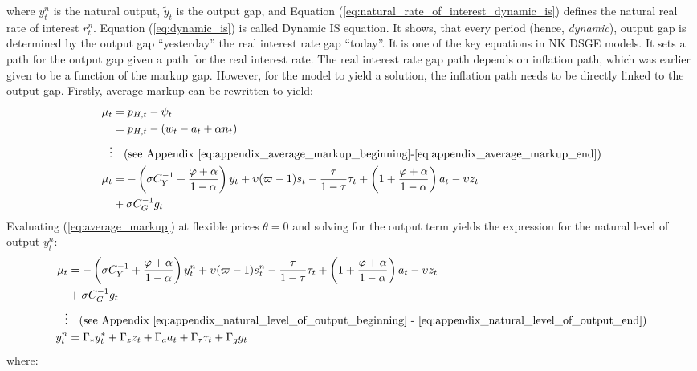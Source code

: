 where $y^n_{t}$ is the natural output, $\tilde{y}_t$ is the output gap, and Equation (\ref{eq:natural_rate_of_interest_dynamic_is}) defines the natural real rate of interest $r_t^n$. Equation (\ref{eq:dynamic_is}) is called Dynamic IS equation. It shows, that every period (hence, \textit{dynamic}), output gap is determined by the output gap ``yesterday'' the real interest rate gap ``today''. It is one of the key equations in NK DSGE models. It sets a path for the output gap given a path for the real interest rate. The real interest rate gap path depends on inflation path, which was earlier given to be a function of the markup gap. However, for the model to yield a solution, the inflation path needs to be directly linked to the output gap. Firstly, average markup can be rewritten to yield:
\begin{align}
    \mu_t &= p_{H,t} - \psi_t \\
     &= p_{H,t} - (w_t - a_t + \alpha n_t) \nonumber \\
    \vdots & \quad \text{(see Appendix \ref{eq:appendix_average_markup_beginning}-\ref{eq:appendix_average_markup_end})} \nonumber \\
    \mu_t &= -\left(\sigma C_Y^{-1} + \frac{\varphi + \alpha}{1-\alpha}\right)y_t + \upsilon (\varpi - 1) s_t - \frac{\tau}{1-\tau}\tau_t  + \left(1 + \frac{\varphi + \alpha}{1-\alpha}\right)a_t - \upsilon z_t \nonumber \\ 
    &+ \sigma C_G^{-1} g_t  \label{eq:average_markup}
\end{align}
Evaluating (\ref{eq:average_markup}) at flexible prices $\theta=0$ and solving for the output term yields the expression for the natural level of output $y_t^n$:
\begin{align}
    \mu_t &= -\left(\sigma C_Y^{-1} + \frac{\varphi + \alpha}{1-\alpha}\right)y^n_t + \upsilon (\varpi - 1) s^n_t - \frac{\tau}{1-\tau}\tau_t  + \left(1 + \frac{\varphi + \alpha}{1-\alpha}\right)a_t - \upsilon z_t \nonumber \\ 
    &+ \sigma C_G^{-1} g_t \label{eq:average_markup_flexible_prices}\\
    \vdots & \quad \text{(see Appendix \ref{eq:appendix_natural_level_of_output_beginning} - \ref{eq:appendix_natural_level_of_output_end})} \nonumber \\
    y^n_t &= \Gamma_* y^*_t + \Gamma_z z_t + \Gamma_a a_t + \Gamma_\tau \tau_t + \Gamma_g g_t \label{eq:natural_output}
\end{align}
where:
